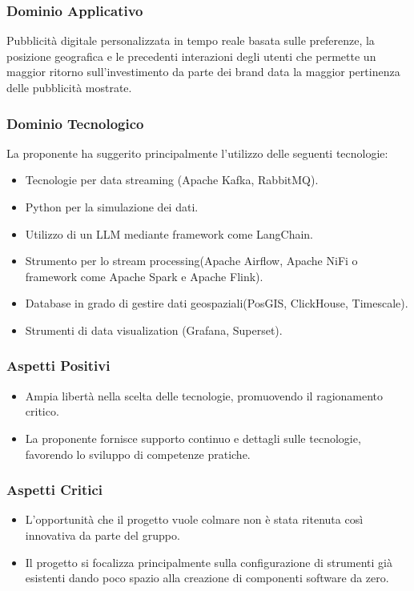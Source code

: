 \documentclass[a4paper, 12pt]{article}
\begin{document}
\subsubsection{Dominio Applicativo}
Pubblicità digitale personalizzata in tempo reale basata sulle preferenze, la posizione geografica e le precedenti interazioni degli utenti che permette un maggior ritorno sull’investimento da parte dei brand data la maggior pertinenza delle pubblicità mostrate.

\subsubsection{Dominio Tecnologico}
La proponente ha suggerito principalmente l’utilizzo delle seguenti tecnologie:
\begin{itemize}
    \item Tecnologie per data streaming (Apache Kafka, RabbitMQ).
    \item Python per la simulazione dei dati.
    \item Utilizzo di un LLM mediante framework come LangChain.
    \item Strumento per lo stream processing(Apache Airflow, Apache NiFi o framework come Apache Spark e Apache Flink).
    \item Database in grado di gestire dati geospaziali(PosGIS, ClickHouse, Timescale).
    \item Strumenti di data visualization (Grafana, Superset).
\end{itemize}

\subsubsection{Aspetti Positivi}
\begin{itemize}
    \item Ampia libertà nella scelta delle tecnologie, promuovendo il ragionamento critico.
    \item La proponente fornisce supporto continuo e dettagli sulle tecnologie, favorendo lo sviluppo di competenze pratiche.
\end{itemize}

\subsubsection{Aspetti Critici}
\begin{itemize}
    \item L’opportunità che il progetto vuole colmare non è stata ritenuta così innovativa da parte del gruppo.
    \item Il progetto si focalizza principalmente sulla configurazione di strumenti già esistenti dando poco spazio alla creazione di componenti software da zero.
\end{itemize}
\end{document}
